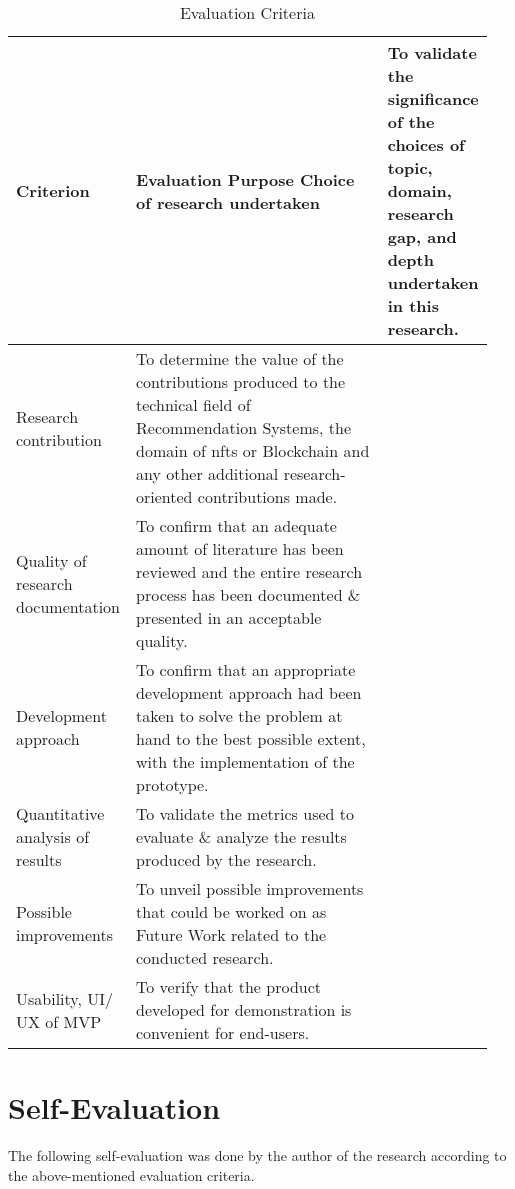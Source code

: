 \vspace{-4mm}
\begin{longtable}{|p{0.22\linewidth}|p{0.726\linewidth}|}
\caption{Evaluation Criteria}\\ 
\hline
\textbf{Criterion} & \textbf{Evaluation Purpose} \endfirsthead 
\hline
Choice of research undertaken & To validate the significance of the choices of topic, domain, research gap, and depth undertaken in this research. \\ 
\hline
Research contribution & To determine the value of the contributions produced to the technical field of Recommendation Systems, the domain of \gls{nft}s or Blockchain and any other additional research-oriented contributions made. \\ 
\hline
Quality of research documentation & To confirm that an adequate amount of literature has been reviewed and the entire research process has been documented \& presented in an acceptable quality. \\ 
\hline
Development approach & To confirm that an appropriate development approach had been taken to solve the problem at hand to the best possible extent, with the implementation of the prototype.\\ 
\hline
Quantitative analysis of results & To validate the metrics used to evaluate \& analyze the results produced by the research. \\ 
\hline
Possible improvements & To unveil possible improvements that could be worked on as Future Work related to the conducted research. \\
\hline
Usability, UI/ UX of MVP &
To verify that the product developed for demonstration is convenient for end-users. \\
\hline
\end{longtable}

\section{Self-Evaluation}

The following self-evaluation was done by the author of the research according to the above-mentioned evaluation criteria.

